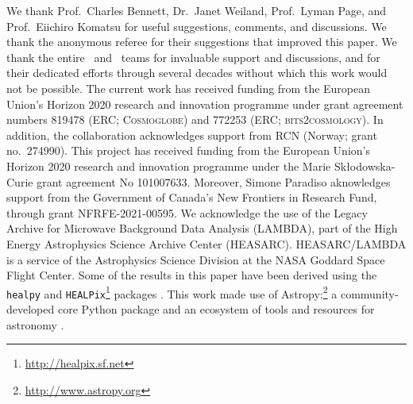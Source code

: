 \begin{acknowledgements}
  We thank Prof.~Charles Bennett, Dr.~Janet Weiland, Prof.~Lyman Page, and
  Prof.~Eiichiro Komatsu for useful suggestions, comments, and discussions. We thank the anonymous referee for their suggestions that improved this paper.
  We thank the entire \Planck\ and \WMAP\ teams for
  invaluable support and discussions, and for their dedicated efforts
  through several decades without which this work would not be
  possible. The current work has received funding from the European
  Union’s Horizon 2020 research and innovation programme under grant
  agreement numbers 819478 (ERC; \textsc{Cosmoglobe}) and 772253 (ERC;
  \textsc{bits2cosmology}).
  In
  addition, the collaboration acknowledges support from
  RCN (Norway; grant no.\ 274990). 
	This project has received funding from the European Union’s Horizon 2020 research and innovation programme under the Marie Skłodowska-Curie grant agreement No 101007633.
	Moreover, Simone Paradiso aknowledges
  support from the Government of Canada's New Frontiers in Research Fund,
  through grant NFRFE-2021-00595.
  We acknowledge the use of the Legacy Archive for Microwave Background Data
  Analysis (LAMBDA), part of the High Energy Astrophysics Science Archive Center
  (HEASARC). HEASARC/LAMBDA is a service of the Astrophysics Science Division at
  the NASA Goddard Space Flight Center.  
  Some of the results in this paper have been derived using the \texttt{healpy}
  and \texttt{HEALPix}\footnote{\url{http://healpix.sf.net}} packages
  \citep{gorski2005, Zonca2019}.  This work made use of
  Astropy:\footnote{\url{http://www.astropy.org}} a community-developed
  core Python package and an ecosystem of tools and resources for
  astronomy \citep{astropy:2013, astropy:2018, astropy:2022}.
\end{acknowledgements}

